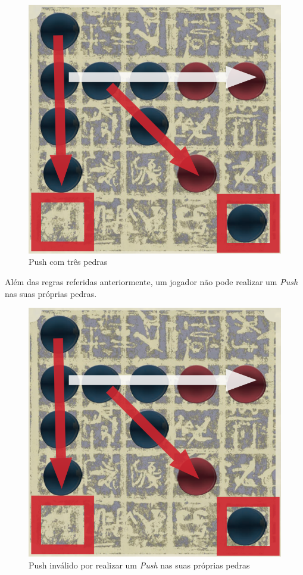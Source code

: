 \documentclass[a4paper]{article}
\begin{document}
\begin{figure}[!htb]
\centering
\includegraphics[scale=0.3]{push2.png}
\caption{Push com três pedras}
\end{figure}

Além das regras referidas anteriormente, um jogador não pode realizar um  \textit{Push} nas suas próprias pedras.

\begin{figure}[!htb]
\centering
\includegraphics[scale=0.3]{push2.png} 
\caption{Push inválido por realizar um \textit{Push} nas suas próprias pedras}
\end{figure}
\end{document}
